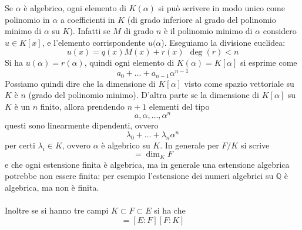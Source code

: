 \begin{osservazione}
	Se $\alpha$ è algebrico, ogni elemento di $K(\alpha)$ si può scrivere in modo unico come polinomio in $\alpha$ a coefficienti in $K$ (di grado inferiore al grado del polinomio minimo di $\alpha$ su $K$). Infatti se $M$ di grado $n$ è il polinomio minimo di $\alpha$ considero $u\in K[x]$, e l'elemento corrispondente $u(\alpha$). Eseguiamo la divisione euclidea:
	\begin{equation*}
	u(x)=q(x)M(x)+r(x) \ \ \deg(r)<n
	\end{equation*}
	Si ha $u(\alpha)=r(\alpha)$, quindi ogni elemento di $K(\alpha)=K[\alpha]$ si esprime come 
	\begin{equation*}
	a_0+\dots+a_{n-1}\alpha^{n-1}
	\end{equation*}
	Possiamo quindi dire che la dimensione di $K[\alpha]$ visto come spazio vettoriale su $K$ è $n$ (grado del polinomio minimo). D'altra parte se la dimensione di $K[\alpha]$ su $K$ è un $n$ finito, allora prendendo $n+1$ elementi del tipo
	\begin{equation*}
	a,\alpha,\dots,\alpha^n
	\end{equation*}
	questi sono linearmente dipendenti, ovvero
	\begin{equation*}
	\lambda_0+\dots+\lambda_n\alpha^n
	\end{equation*}
	per certi $\lambda_i\in K$, ovvero $\alpha$ è algebrico su $K$.
	In generale per $F/K$ si scrive 
	\begin{equation*}
	[F:K]=\dim_K F
	\end{equation*}
	e che ogni estensione finita è algebrica, ma in generale una estensione algebrica potrebbe non essere finita: per esempio l'estensione dei numeri algebrici su $\mathbb{Q}$ è algebrica, ma non è finita. \\ \\ Inoltre se si hanno tre campi $K\subset F\subset E$ si ha che 
	\begin{equation*}
	[E:K]=[E:F][F:K]
	\end{equation*}
\end{osservazione}

